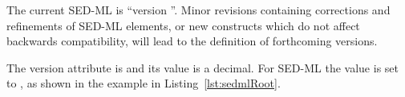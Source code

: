 \subsubsection{}
\label{sec:version}
The current SED-ML  is ``version \version''. Minor revisions containing corrections and refinements of SED-ML elements, or new constructs which do not affect backwards compatibility, will lead to the definition of forthcoming versions.

The version attribute is  and its value is a  decimal. For SED-ML \currentLV the value is set to , as shown in the example in Listing~\ref{lst:sedmlRoot}.


